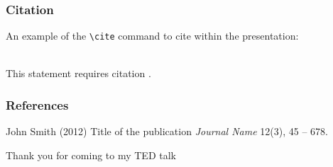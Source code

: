 \documentclass{beamer}
\begin{document}
\begin{frame}[fragile] %
\frametitle{Citation}
An example of the \verb|\cite| command to cite within the presentation:\\~

This statement requires citation \cite{p1}.
\end{frame}


\begin{frame}
\frametitle{References}
\footnotesize{
\begin{thebibliography}{99} %
 John Smith (2012)
\newblock Title of the publication
\newblock \emph{Journal Name} 12(3), 45 -- 678.
\end{thebibliography}
}
\end{frame}


\begin{frame}
\huge{\centerline{Thank you for coming to my TED talk}}
\end{frame}

\end{document}

